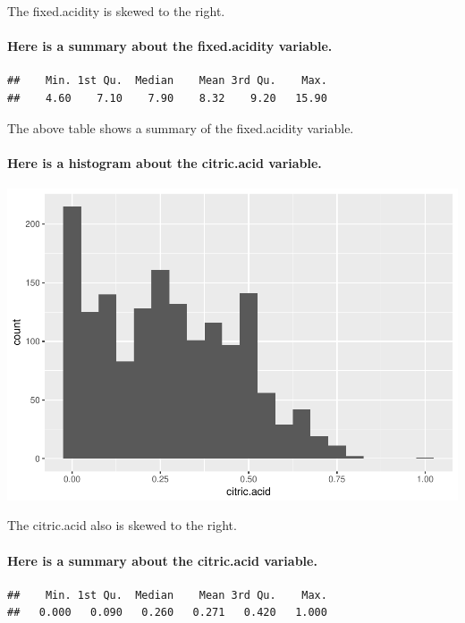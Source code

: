\documentclass[]{article}
\let\oldparagraph\paragraph
\renewcommand{\paragraph}[1]{\oldparagraph{#1}\mbox{}}
\begin{document}
The fixed.acidity is skewed to the right.

\paragraph{Here is a summary about the fixed.acidity
variable.}\label{here-is-a-summary-about-the-fixed.acidity-variable.}

\begin{verbatim}
##    Min. 1st Qu.  Median    Mean 3rd Qu.    Max. 
##    4.60    7.10    7.90    8.32    9.20   15.90
\end{verbatim}

The above table shows a summary of the fixed.acidity variable.

\paragraph{Here is a histogram about the citric.acid
variable.}\label{here-is-a-histogram-about-the-citric.acid-variable.}

\includegraphics{RedWine_files/figure-latex/Make_Plot_Function_For_citric.acid-1.pdf}

The citric.acid also is skewed to the right.

\paragraph{Here is a summary about the citric.acid
variable.}\label{here-is-a-summary-about-the-citric.acid-variable.}

\begin{verbatim}
##    Min. 1st Qu.  Median    Mean 3rd Qu.    Max. 
##   0.000   0.090   0.260   0.271   0.420   1.000
\end{verbatim}
\end{document}
